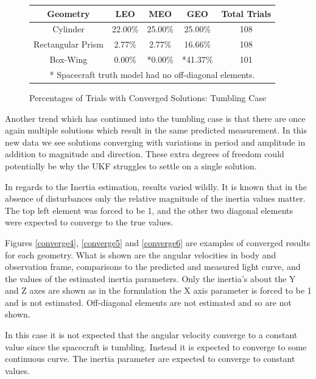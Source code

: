 \begin{figure}[!h]
	\begin{center}
		\begin{tabular}{| c | c | c | c | c |}
			\hline Geometry & LEO & MEO & GEO & Total Trials\\ 
			\hline Cylinder & 22.00\% & 25.00\% & 25.00\% & 108 \\
			\hline Rectangular Prism & 2.77\% & 2.77\% & 16.66\% & 108\\
			\hline Box-Wing & 0.00\% & *0.00\% & *41.37\% & 101\\
			\hline \multicolumn{5}{c}{* Spacecraft truth model had no off-diagonal elements.} \\
			\hline
			
		\end{tabular}
	\end{center}
	\caption{Percentages of Trials with Converged Solutions: Tumbling Case}
	\label{Tumbling_vs_orbit}
\end{figure}

Another trend which has continued into the tumbling case is that there are once again multiple solutions which result in the same predicted measurement. In this new data we see solutions converging with variations in period and amplitude in addition to magnitude and direction. These extra degrees of freedom could potentially be why the UKF struggles to settle on a single solution.

In regards to the Inertia estimation, results varied wildly. It is known that in the absence of disturbances only the relative magnitude of the inertia values matter. The top left element was forced to be 1, and the other two diagonal elements were expected to converge to the true values. 

Figures \ref{converge4}, \ref{converge5} and \ref{converge6} are examples of converged results for each geometry. What is shown are the angular velocities in body and observation frame, comparisons to the predicted and measured light curve, and the values of the estimated inertia parameters. Only the inertia's about the Y and Z axes are shown as in the formulation the X axis parameter is forced to be 1 and is not estimated. Off-diagonal elements are not estimated and so are not shown.

In this case it is not expected that the angular velocity converge to a constant value since the spacecraft is tumbling. Instead it is expected to converge to some continuous curve. The inertia parameter are expected to converge to constant values.

